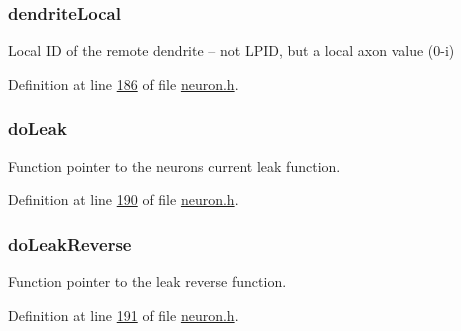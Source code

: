 \hypertarget{structneuron_state_a73e5b16411af572181411b8fd8d5117d}{}
\subsubsection[{dendrite\+Local}]{ dendrite\+Local}\label{structneuron_state_a73e5b16411af572181411b8fd8d5117d}


Local I\+D of the remote dendrite -- not L\+P\+I\+D, but a local axon value (0-\/i) 



Definition at line \hyperlink{neuron_8h_source_l00186}{186} of file \hyperlink{neuron_8h_source}{neuron.\+h}.

\hypertarget{structneuron_state_aa430f424f34dc59dc27736e27ec61320}{}
\subsubsection[{do\+Leak}]{ do\+Leak}\label{structneuron_state_aa430f424f34dc59dc27736e27ec61320}


Function pointer to the neuron\textquotesingle{}s current leak function. 



Definition at line \hyperlink{neuron_8h_source_l00190}{190} of file \hyperlink{neuron_8h_source}{neuron.\+h}.

\hypertarget{structneuron_state_af4ded7f575b64ada6c0a6664f638307c}{}
\subsubsection[{do\+Leak\+Reverse}]{ do\+Leak\+Reverse}\label{structneuron_state_af4ded7f575b64ada6c0a6664f638307c}


Function pointer to the leak reverse function. 



Definition at line \hyperlink{neuron_8h_source_l00191}{191} of file \hyperlink{neuron_8h_source}{neuron.\+h}.

